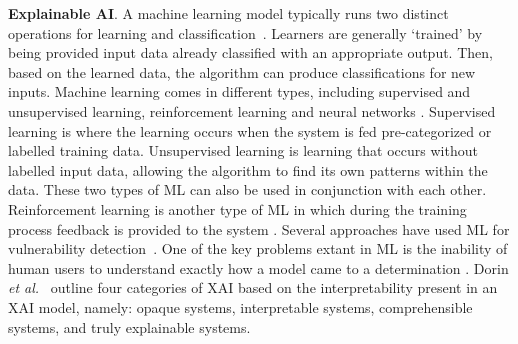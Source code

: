 {\bf Explainable AI}. A machine learning model typically runs
two distinct operations for learning and
classification~\cite{B16,DBLP:conf/icml/MengBK20,DBLP:conf/icml/MukherjeeYBS20,DBLP:conf/icml/NockM20}. Learners
are generally `trained' by being provided input data already
classified with an appropriate output. Then, based on the learned
data, the algorithm can produce classifications for new
inputs. Machine learning comes in different types, including
supervised and unsupervised learning, reinforcement learning and
neural networks
\cite{DBLP:journals/csur/MayerJ20,DBLP:journals/csur/VerbraekenWKKVR20,DBLP:journals/csur/ChenZZ0S020,DBLP:journals/csur/QianSWJLGPJYZRW20,DBLP:journals/csur/GuoCLH020,DBLP:journals/csur/LeCB20,DBLP:journals/comsur/OlowononiRL21}. Supervised
learning is where the learning occurs when the system is fed
pre-categorized or labelled training data. Unsupervised learning is
learning that occurs without labelled input data, allowing the
algorithm to find its own patterns within the data. These two types of
ML can also be used in conjunction with each other. Reinforcement
learning is another type of ML in which during the training process
feedback is provided to the system
\cite{DBLP:conf/icml/AgarwalS020,DBLP:conf/icml/0003KWGL20,DBLP:journals/comsur/LeiTZLZS20,DBLP:journals/csur/MendoncaZB19}. Several
approaches have used ML for vulnerability
detection~\cite{li2018vuldeepecker,zhou2019devign,li2018sysevr,russell2018automated,chakraborty2020deep}. One
of the key problems extant in ML is the inability of human users to
understand exactly how a model came to a determination
\cite{DBLP:journals/comsur/LeiTZLZS20}.
Dorin {\em et al.}~\cite{doran17} outline four categories of XAI based
on the interpretability present in an XAI model, namely: opaque
systems, interpretable systems, comprehensible systems, and truly
explainable systems.

